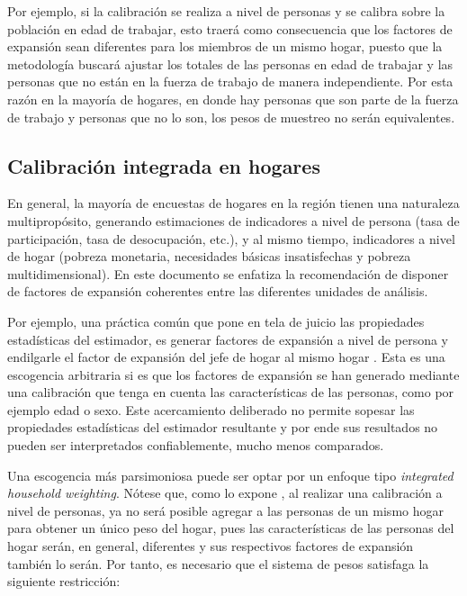 \documentclass[
  10pt,
  spanish,
]{book}
\begin{document}
Por ejemplo, si la calibración se realiza a nivel de personas y se calibra sobre la población en edad de trabajar, esto traerá como consecuencia que los factores de expansión sean diferentes para los miembros de un mismo hogar, puesto que la metodología buscará ajustar los totales de las personas en edad de trabajar y las personas que no están en la fuerza de trabajo de manera independiente. Por esta razón en la mayoría de hogares, en donde hay personas que son parte de la fuerza de trabajo y personas que no lo son, los pesos de muestreo no serán equivalentes.

\hypertarget{calibraciuxf3n-integrada-en-hogares}{%
\subsection{Calibración integrada en hogares}\label{calibraciuxf3n-integrada-en-hogares}}

En general, la mayoría de encuestas de hogares en la región tienen una naturaleza multipropósito, generando estimaciones de indicadores a nivel de persona (tasa de participación, tasa de desocupación, etc.), y al mismo tiempo, indicadores a nivel de hogar (pobreza monetaria, necesidades básicas insatisfechas y pobreza multidimensional). En este documento se enfatiza la recomendación de disponer de factores de expansión coherentes entre las diferentes unidades de análisis.

Por ejemplo, una práctica común que pone en tela de juicio las propiedades estadísticas del estimador, es generar factores de expansión a nivel de persona y endilgarle el factor de expansión del jefe de hogar al mismo hogar \citep{Alexander_1987}. Esta es una escogencia arbitraria si es que los factores de expansión se han generado mediante una calibración que tenga en cuenta las características de las personas, como por ejemplo edad o sexo. Este acercamiento deliberado no permite sopesar las propiedades estadísticas del estimador resultante y por ende sus resultados no pueden ser interpretados confiablemente, mucho menos comparados.

Una escogencia más parsimoniosa puede ser optar por un enfoque tipo \emph{integrated household weighting}. Nótese que, como lo expone \citet{Heldal_1992}, al realizar una calibración a nivel de personas, ya no será posible agregar a las personas de un mismo hogar para obtener un único peso del hogar, pues las características de las personas del hogar serán, en general, diferentes y sus respectivos factores de expansión también lo serán. Por tanto, es necesario que el sistema de pesos satisfaga la siguiente restricción:
\end{document}
